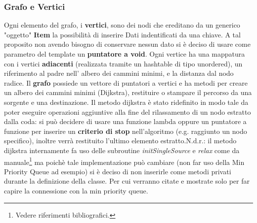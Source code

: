 \newpage
\subsubsection{Grafo e Vertici}
\indent Ogni elemento del grafo, i \textbf{vertici}, sono dei nodi che ereditano da un generico "oggetto"
\textbf{Item} la possibilit\`a di inserire Dati indentificati da una chiave. A tal proposito non avendo
bisogno di conservare nessun dato si \`e deciso di usare come parametro del template un \textbf{puntatore
a void}. Ogni vertice ha una mappatura con i vertici \textbf{adiacenti} (realizzata tramite un hashtable
di tipo unordered), un riferimento al padre nell' albero dei cammini minimi, e la distanza dal nodo radice.
\newline\indent Il \textbf{grafo} possiede un vettore di puntatori a vertici e ha metodi per creare un albero
dei cammini minimi (Dijkstra), restituire o stampare il percorso da una sorgente e una destinazione.
Il metodo dijkstra \`e stato ridefinito in modo tale da poter eseguire operazioni aggiuntive alla fine
del rilassamento di un nodo estratto dalla coda: si pu\`o decidere di usare una funzione lambda oppure un
puntatore a funzione per inserire un \textbf{criterio di stop} nell'algoritmo (e.g. raggiunto un nodo
specifico), inoltre verr\`a restituito l'ultimo elemento estratto.\newline N.d.r.: il metodo dijkstra
internamente fa uso delle subroutine \textit{initSingleSource} e \textit{relax} come da
manuale\footnote{Vedere riferimenti bibliografici.} ma poich\`e tale implementazione
pu\`o cambiare (non far uso della Min Priority Queue ad esempio) si \`e deciso di non inserirle come
metodi privati durante la definizione della classe. Per cui verranno citate e mostrate solo per far capire
la connessione con la min priority queue.
